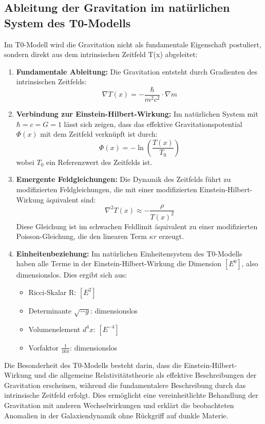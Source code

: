 \documentclass[12pt,a4paper]{article}
\begin{document}
	\subsection*{Ableitung der Gravitation im natürlichen System des T0-Modells}
	
	Im T0-Modell wird die Gravitation nicht als fundamentale Eigenschaft postuliert, sondern direkt aus dem intrinsischen Zeitfeld T(x) abgeleitet:
	
	\begin{enumerate}
		\item \textbf{Fundamentale Ableitung:} Die Gravitation entsteht durch Gradienten des intrinsischen Zeitfelds:
		\[
		\nabla T(x) = -\frac{\hbar}{m^2c^2} \cdot \nabla m
		\]
		
		\item \textbf{Verbindung zur Einstein-Hilbert-Wirkung:} Im natürlichen System mit $\hbar = c = G = 1$ lässt sich zeigen, dass das effektive Gravitationspotential $\Phi(x)$ mit dem Zeitfeld verknüpft ist durch:
		\[
		\Phi(x) = -\ln\left(\frac{T(x)}{T_0}\right)
		\]
		wobei $T_0$ ein Referenzwert des Zeitfelds ist.
		
		\item \textbf{Emergente Feldgleichungen:} Die Dynamik des Zeitfelds führt zu modifizierten Feldgleichungen, die mit einer modifizierten Einstein-Hilbert-Wirkung äquivalent sind:
		\[
		\nabla^2T(x) \approx -\frac{\rho}{T(x)^2}
		\]
		Diese Gleichung ist im schwachen Feldlimit äquivalent zu einer modifizierten Poisson-Gleichung, die den linearen Term $\kappa r$ erzeugt.
		
		\item \textbf{Einheitenbeziehung:} Im natürlichen Einheitensystem des T0-Modells haben alle Terme in der Einstein-Hilbert-Wirkung die Dimension $[E^0]$, also dimensionslos. Dies ergibt sich aus:
		\begin{itemize}
			\item Ricci-Skalar R: $[E^2]$
			\item Determinante $\sqrt{-g}$: dimensionslos
			\item Volumenelement $d^4x$: $[E^{-4}]$
			\item Vorfaktor $\frac{1}{16\pi}$: dimensionslos
		\end{itemize}
	\end{enumerate}
	
	Die Besonderheit des T0-Modells besteht darin, dass die Einstein-Hilbert-Wirkung und die allgemeine Relativitätstheorie als effektive Beschreibungen der Gravitation erscheinen, während die fundamentalere Beschreibung durch das intrinsische Zeitfeld erfolgt. Dies ermöglicht eine vereinheitlichte Behandlung der Gravitation mit anderen Wechselwirkungen und erklärt die beobachteten Anomalien in der Galaxiendynamik ohne Rückgriff auf dunkle Materie.
\end{document}

